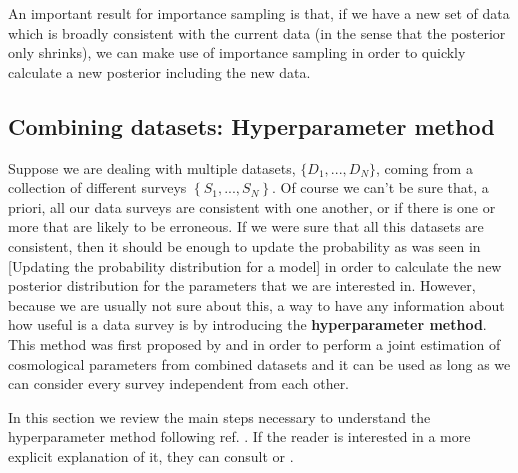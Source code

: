 \documentclass[onecolumn,           %
               showpacs,            %
               preprintnumbers,     %
               aps,                 %
               prl,          	    %
               letterpaper,             %
               superscriptaddress,      %
               nofootinbib,         %
               tightenlines,        %
               floats,floatfix      %
               ,usenatbib,
               ]{revtex4-1}
\begin{document}
An important result for importance sampling is that, if we have a new set of data which is broadly consistent with the current data (in the sense that the posterior only shrinks), we can make use of importance sampling in order to quickly calculate a new posterior including the new data.
\subsection{Combining datasets: Hyperparameter method}

Suppose we are dealing with multiple datasets,  $\lbrace D_1,...,D_N\rbrace$, coming from a collection of different surveys $\left\lbrace S_1,...,S_N\right\rbrace$. Of course we can't be sure that, a priori, all our data surveys are consistent with one another, or if there is one or more that are likely to be erroneous. If we were sure that all this datasets are consistent, then it should be enough to update the probability as was seen in [Updating the probability distribution for a model] in order to calculate the new posterior distribution for the parameters that we are interested in. However, because we are usually not sure about this, a way to have any information about how useful is a data survey is by introducing the \textbf{hyperparameter method}. This method was first proposed by \cite{hiperp} and \cite{hiperp1} in order to perform a joint estimation of cosmological parameters from combined datasets and it can be used as long as we can consider every survey independent from each other.

In this section we review the main steps necessary to understand the hyperparameter method following ref. \cite{hiperp1}. If the reader is interested in a more explicit explanation of it, they can consult \cite{hiperp} or \cite{hiperp1}.
\end{document}

